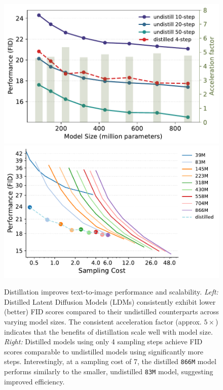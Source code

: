 \begin{figure}[!t]
    \centering
    \def\xwidth{.31\linewidth}
    \includegraphics[height=\xwidth]{cp2/figures/analyze_distill_perfomrance.pdf}
    \includegraphics[height=\xwidth]{cp2/figures/analyze_distill_inference_costs.pdf}
    \vspace{-.5\baselineskip}
    \caption{Distillation improves text-to-image performance and scalability. \emph{Left:} Distilled Latent Diffusion Models (LDMs) consistently exhibit lower (better) FID scores compared to their undistilled counterparts across varying model sizes. The consistent acceleration factor (approx. $5\times$) indicates that the benefits of distillation scale well with model size.
    \emph{Right:} Distilled models using only 4 sampling steps achieve FID scores comparable to undistilled models using significantly more steps. Interestingly, at a sampling cost of 7, the distilled \texttt{866M} model performs similarly to the smaller, undistilled \texttt{83M} model, suggesting improved efficiency. 
    }
    \label{fig:distll}
    \vspace{-1\baselineskip}
\end{figure}


